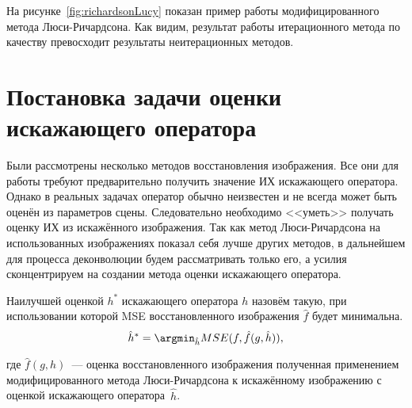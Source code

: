 На рисунке~\ref{fig:richardsonLucy} показан пример работы модифицированного метода Люси-Ричардсона. Как видим, результат работы итерационного метода по качеству превосходит результаты неитерационных методов.


\begin{comment}
\subsection{Слепая деконволюция}
\end{comment}

\section{Постановка задачи оценки искажающего оператора}
Были рассмотрены несколько методов восстановления изображения. Все они для работы требуют предварительно получить значение ИХ искажающего оператора. Однако в реальных задачах оператор обычно неизвестен и не всегда может быть оценён из параметров сцены. Следовательно необходимо  <<уметь>> получать оценку ИХ из искажённого изображения. Так как метод Люси-Ричардсона на использованных изображениях показал себя лучше других методов, в дальнейшем для процесса деконволюции будем рассматривать только его, а усилия сконцентрируем на создании метода оценки искажающего оператора.
\begin{definition}\label{def:bestPsfEstimaton}
	Наилучшей оценкой $h^*$ искажающего оператора $h$ назовём такую, при использовании которой MSE восстановленного изображения $\hat{f}$ будет минимальна.
	\begin{equation}\label{eq:bestPsf}
	\hat{h}^* = \argmin_{\hat{h}}MSE(f, \hat{f}(g,\hat{h})),
	\end{equation}
\end{definition}
где $\hat{f}(g,h)$~--- оценка восстановленного изображения полученная применением модифицированного метода Люси-Ричардсона к искажённому изображению с оценкой искажающего оператора~$\hat{h}$. 
